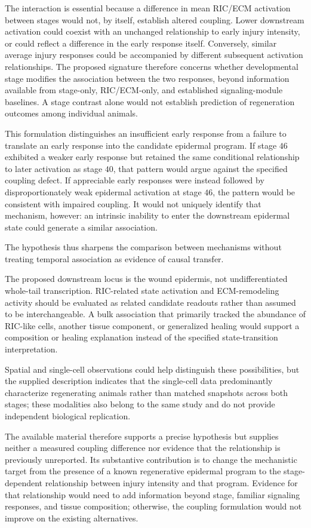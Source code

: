 \documentclass[11pt]{article}
\begin{document}
The interaction is essential because a difference in mean RIC/ECM activation between stages would not, by itself, establish altered coupling. Lower downstream activation could coexist with an unchanged relationship to early injury intensity, or could reflect a difference in the early response itself. Conversely, similar average injury responses could be accompanied by different subsequent activation relationships. The proposed signature therefore concerns whether developmental stage modifies the association between the two responses, beyond information available from stage-only, RIC/ECM-only, and established signaling-module baselines. A stage contrast alone would not establish prediction of regeneration outcomes among individual animals.

This formulation distinguishes an insufficient early response from a failure to translate an early response into the candidate epidermal program. If stage $46$ exhibited a weaker early response but retained the same conditional relationship to later activation as stage $40$, that pattern would argue against the specified coupling defect. If appreciable early responses were instead followed by disproportionately weak epidermal activation at stage $46$, the pattern would be consistent with impaired coupling. It would not uniquely identify that mechanism, however: an intrinsic inability to enter the downstream epidermal state could generate a similar association.

The hypothesis thus sharpens the comparison between mechanisms without treating temporal association as evidence of causal transfer.

The proposed downstream locus is the wound epidermis, not undifferentiated whole-tail transcription. RIC-related state activation and ECM-remodeling activity should be evaluated as related candidate readouts rather than assumed to be interchangeable. A bulk association that primarily tracked the abundance of RIC-like cells, another tissue component, or generalized healing would support a composition or healing explanation instead of the specified state-transition interpretation.

Spatial and single-cell observations could help distinguish these possibilities, but the supplied description indicates that the single-cell data predominantly characterize regenerating animals rather than matched snapshots across both stages; these modalities also belong to the same study and do not provide independent biological replication.

The available material therefore supports a precise hypothesis but supplies neither a measured coupling difference nor evidence that the relationship is previously unreported. Its substantive contribution is to change the mechanistic target from the presence of a known regenerative epidermal program to the stage-dependent relationship between injury intensity and that program. Evidence for that relationship would need to add information beyond stage, familiar signaling responses, and tissue composition; otherwise, the coupling formulation would not improve on the existing alternatives.
\end{document}
